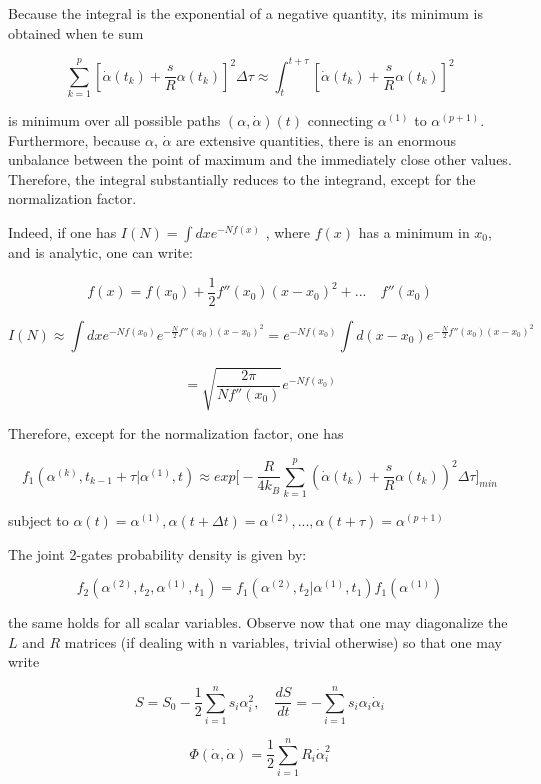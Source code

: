 \documentclass{article}
\begin{document}
Because the integral is the exponential of a negative quantity, its minimum is obtained when te sum

$$ \sum_{k=1}^{p} [\dot{\alpha}(t_k) + \frac{s}{R}\alpha(t_k)]^2 \Delta \tau \approx \int_{t}^{t+\tau} [\dot{\alpha}(t_k) + \frac{s}{R}\alpha(t_k)]^2 $$

is minimum over all possible paths $(\alpha,\dot{\alpha})(t)$ connecting $\alpha^{(1)}$ to $\alpha^{(p+1)}$. Furthermore, because $\alpha$, $\dot{\alpha}$ are extensive quantities, there is an enormous unbalance between the point of maximum and the immediately close other values. Therefore, the integral substantially reduces to the integrand, except for the normalization factor.

Indeed, if one has $I(N) = \int dx e^{-N f(x)}$ , where $f(x)$ has a minimum in $x_0$, and is analytic, one can write:

$$ f(x) = f(x_0) + \frac{1}{2} f''(x_0)(x-x_0)^2+... \quad f''(x_0)$$

$$I(N) \approx \int dx e^{-N f(x_0)} e^{-\frac{N}{2} f''(x_0)(x-x_0)^2} = e^{-N f(x_0)} \int d(x-x_0) e^{-\frac{N}{2} f''(x_0)(x-x_0)^2} $$

$$ = \sqrt{\frac{2 \pi}{N f''(x_0)}} e^{-N f(x_0)}$$

Therefore, except for the normalization factor, one has

$$ f_1(\alpha^{(k)},t_{k-1} + \tau| \alpha^{(1)},t) \approx  exp \Big [-\frac{R}{4 k_B} \sum_{k=1}^{p}(\dot{\alpha}(t_k) + \frac{s}{R}\alpha(t_k))^2 \Delta \tau \Big ]_{min} $$

subject to $\alpha(t)=\alpha^{(1)}, \alpha(t+\Delta t)=\alpha^{(2)},...,\alpha(t+\tau)=\alpha^{(p+1)}$

The joint 2-gates probability density is given by:

\begin{equation}
f_2(\alpha^{(2)},t_2 ,\alpha^{(1)},t_1) = f_1(\alpha^{(2)},t_2 |\alpha^{(1)},t_1) f_1(\alpha^{(1)})
\end{equation}

the same holds for all scalar variables.
Observe now that one may diagonalize the $L$ and $R$ matrices (if dealing with n variables, trivial otherwise) so that one may write

$$ S = S_0 -\frac{1}{2} \sum_{i=1}^{n} s_i \alpha^2_i , \quad \frac{dS}{dt} = - \sum_{i=1}^{n} s_i \alpha_i \dot{\alpha}_i$$

$$ \Phi(\dot{\alpha},\dot{\alpha}) = \frac{1}{2}  \sum_{i=1}^{n} R_i \dot{\alpha}^2_i $$
\end{document}
